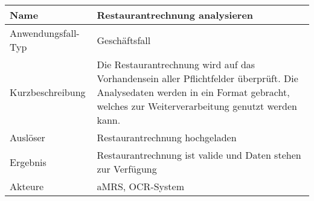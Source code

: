 \begin{table}[H]
    \centering
    \label{}
    \begin{tabularx}{\textwidth}{| l | X |}
        \hline
        Name               & Restaurantrechnung analysieren                                                                                                                                                       \\
        \hline
        Anwendungsfall-Typ & Geschäftsfall                                                                                                                                                                         \\
        \hline
        Kurzbeschreibung   & Die Restaurantrechnung wird auf das Vorhandensein aller Pflichtfelder überprüft. Die Analysedaten werden in ein Format gebracht, welches zur Weiterverarbeitung genutzt werden kann. \\
        \hline
        Auslöser           & Restaurantrechnung hochgeladen                                                                                                                                                       \\
        \hline
        Ergebnis           & Restaurantrechnung ist valide und Daten stehen zur Verfügung                                                                                                                         \\
        \hline
        Akteure            & \ac{aMRS}, OCR-System                                                                                                                                                                 \\
        \hline
    \end{tabularx}
\end{table}


